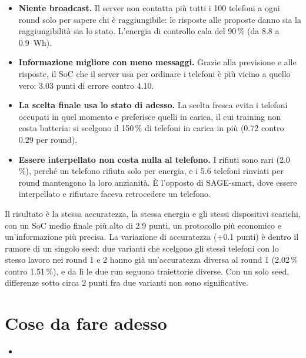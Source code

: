 \documentclass[11pt,a4paper]{article}
\begin{document}
\begin{itemize}
  \item \textbf{Niente broadcast.} Il server non contatta più tutti i 100
        telefoni a ogni round solo per sapere chi è raggiungibile: le risposte
        alle proposte danno sia la raggiungibilità sia lo stato. L'energia di
        controllo cala del 90\,\% (da 8.8 a \SI{0.9}{Wh}).
  \item \textbf{Informazione migliore con meno messaggi.} Grazie alla
        previsione e alle risposte, il SoC che il server usa per ordinare i
        telefoni è più vicino a quello vero: 3.03 punti di errore contro 4.10.
  \item \textbf{La scelta finale usa lo stato di adesso.} La scelta fresca evita
        i telefoni occupati in quel momento e preferisce quelli in carica, il cui
        training non costa batteria: si scelgono il 150\,\% di telefoni in carica
        in più (0.72 contro 0.29 per round).
  \item \textbf{Essere interpellato non costa nulla al telefono.} I rifiuti sono
        rari (2.0\,\%), perché un telefono rifiuta solo per energia, e i 5.6
        telefoni rinviati per round mantengono la loro anzianità. È l'opposto di
        SAGE-smart, dove essere interpellato e rifiutare faceva retrocedere un
        telefono.
\end{itemize}
Il risultato è la stessa accuratezza, la stessa energia e gli stessi
dispositivi scarichi, con un SoC medio finale più alto di 2.9 punti, un
protocollo più economico e un'informazione più precisa. La variazione di
accuratezza (+0.1 punti) è dentro il rumore di un singolo seed: due varianti che
scelgono gli stessi telefoni con lo stesso lavoro nei round 1 e 2 hanno già
un'accuratezza diversa al round 1 (2.02\,\% contro 1.51\,\%), e da lì le due
run seguono traiettorie diverse. Con un solo seed, differenze sotto circa 2
punti fra due varianti non sono significative.

\section{Cose da fare adesso}
\begin{itemize}
    \item
\end{itemize}
\end{document}
